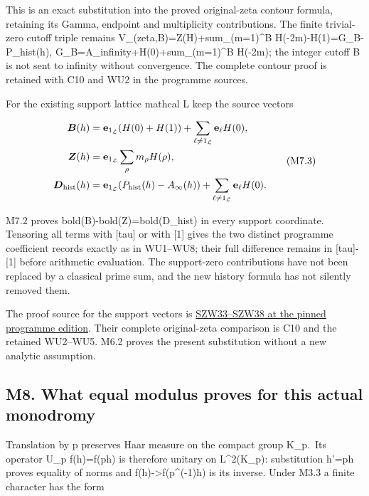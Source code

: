 This is an exact substitution into the proved original-zeta contour
formula, retaining its Gamma, endpoint and multiplicity contributions.
The finite trivial-zero cutoff triple remains
V\_(zeta,B)=Z(H)+sum\_(m=1)\^{}B H(-2m)-H(1)=G\_B-P\_hist(h),
G\_B=A\_infinity+H(0)+sum\_(m=1)\^{}B H(-2m); the integer cutoff B is
not sent to infinity without convergence. The complete contour proof is
retained with C10 and WU2 in the programme sources.

For the existing support lattice mathcal L keep the source vectors

\[
\begin{aligned}
\boldsymbol B(h)&=\mathbf e_{1_{\mathcal L}}(H(0)+H(1))
+\sum_{\ell\ne1_{\mathcal L}}\mathbf e_\ell H(0),\\
\boldsymbol Z(h)&=\mathbf e_{1_{\mathcal L}}\sum_\rho m_\rho H(\rho),\\
\boldsymbol D_{\rm hist}(h)&=\mathbf e_{1_{\mathcal L}}(P_{\rm hist}(h)-A_\infty(h))
+\sum_{\ell\ne1_{\mathcal L}}\mathbf e_\ell H(0).
\end{aligned}
\tag{M7.3}
\]

M7.2 proves bold(B)-bold(Z)=bold(D\_hist) in every support coordinate.
Tensoring all terms with {[}tau{]} or with {[}1{]} gives the two
distinct programme coefficient records exactly as in WU1--WU8; their
full difference remains in {[}tau{]}-{[}1{]} before arithmetic
evaluation. The support-zero contributions have not been replaced by a
classical prime sum, and the new history formula has not silently
removed them.

The proof source for the support vectors is
\href{https://github.com/KokunoYumeto/zeta-function-research-reader/blob/76f421965914beb133df797835f940849844dc4f/workbenches/splitzero-tandem/branches/tau-zero-prime-positivity/SUPPORTED_ZERO_PRIME_WEIL_DERIVATION.md}{SZW33--SZW38
at the pinned programme edition}. Their complete original-zeta
comparison is C10 and the retained WU2--WU5. M6.2 proves the present
substitution without a new analytic assumption.

\subsection{M8. What equal modulus proves for this actual
monodromy}\label{m8.-what-equal-modulus-proves-for-this-actual-monodromy}

Translation by p preserves Haar measure on the compact group K\_p.~Its
operator U\_p f(h)=f(ph) is therefore unitary on L\^{}2(K\_p):
substitution h'=ph proves equality of norms and
f(h)-\textgreater f(p\^{}(-1)h) is its inverse. Under M3.3 a finite
character has the form

